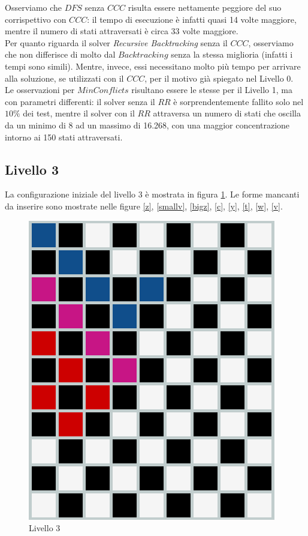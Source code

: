 Osserviamo che $DFS$ senza $CCC$ risulta essere nettamente peggiore del suo corrispettivo con $CCC$: il tempo di esecuzione è infatti quasi 14 volte maggiore, mentre il numero di stati attraversati è circa 33 volte maggiore.\\

Per quanto riguarda il solver \textit{Recursive Backtracking} senza il $CCC$, osserviamo che non differisce di molto dal $Backtracking$ senza la stessa miglioria (infatti i tempi sono simili). Mentre, invece, essi necessitano molto più tempo per arrivare alla soluzione, se utilizzati con il $CCC$, per il motivo già spiegato nel Livello 0.\\

Le osservazioni per $MinConflicts$ risultano essere le stesse per il Livello 1, ma con parametri differenti: il solver senza il $RR$ è sorprendentemente fallito solo nel $10\%$ dei test, mentre il solver con il $RR$ attraversa un numero di stati che oscilla da un minimo di 8 ad un massimo di 16.268, con una maggior concentrazione intorno ai 150 stati attraversati.

\subsection{Livello 3}
La configurazione iniziale del livello 3 è mostrata in figura \ref{lev3}. Le forme mancanti da inserire sono mostrate nelle figure \ref{z}, \ref{smallv}, \ref{bigz}, \ref{c}, \ref{y}, \ref{t}, \ref{w}, \ref{v}.
\begin{figure}[h]
	\centering
	\includegraphics[scale=0.3]{immagini/lv3}
	\caption{Livello 3}
	\label{lev3}
\end{figure}
\\
\noindent

